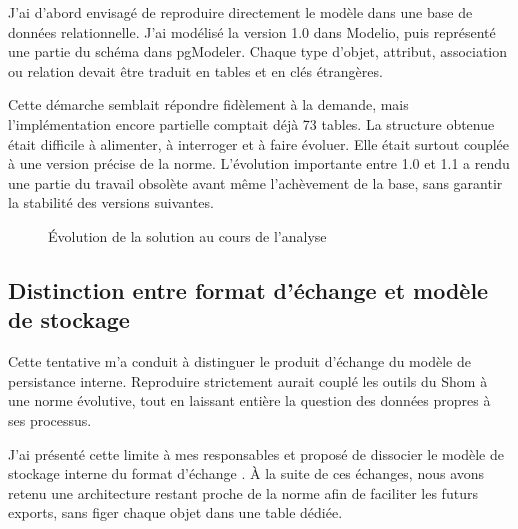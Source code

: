 J'ai d'abord envisagé de reproduire directement le modèle  dans une base de données relationnelle. J'ai modélisé la version 1.0 dans Modelio, puis représenté une partie du schéma dans pgModeler. Chaque type d'objet, attribut, association ou relation devait être traduit en tables et en clés étrangères.

Cette démarche semblait répondre fidèlement à la demande, mais l'implémentation encore partielle comptait déjà 73 tables. La structure obtenue était difficile à alimenter, à interroger et à faire évoluer. Elle était surtout couplée à une version précise de la norme. L'évolution importante entre  1.0 et 1.1 a rendu une partie du travail obsolète avant même l'achèvement de la base, sans garantir la stabilité des versions suivantes.

\begin{figure}[H]
\centering
{}
\caption{Évolution de la solution au cours de l'analyse}
\label{fig:evolution-solution-s123}
\end{figure}

\subsection{Distinction entre format d'échange et modèle de stockage}

Cette tentative m'a conduit à distinguer le produit d'échange du modèle de persistance interne. Reproduire strictement  aurait couplé les outils du Shom à une norme évolutive, tout en laissant entière la question des données propres à ses processus.

J'ai présenté cette limite à mes responsables et proposé de dissocier le modèle de stockage interne du format d'échange . À la suite de ces échanges, nous avons retenu une architecture restant proche de la norme afin de faciliter les futurs exports, sans figer chaque objet  dans une table dédiée.

